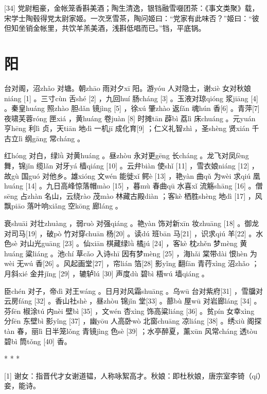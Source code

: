 \documentclass[12pt,UTF8]{ctexbook}
\begin{document}
[34] 党尉粗豪，金帐笼香斟美酒；陶生清逸，银铛融雪啜团茶：《事文类聚》载，宋学士陶毂得党太尉家姬。一次烹雪茶，陶问姬曰：“党家有此味否？”姬曰：“彼但知坐销金帐里，共饮羊羔美酒，浅斟低唱而已。”铛，平底锅。





\chapter{阳}


台对阁，沼zhǎo 对塘。朝zhāo 雨对夕xī 阳。游yóu 人对隐士，谢xiè 女对秋娘niáng [1] 。三寸cùn 舌shé [2] ，九回huí 肠cháng [3] 。玉液对琼qióng 浆jiāng [4] 。秦皇huáng 照zhào 胆dǎn 镜jìng [5] ，徐xú 肇zhào 返fǎn 魂hún 香[6] 。青萍[7] 夜啸芙蓉róng 匣xiá ，黄huáng 卷juàn [8] 时摊tān 薜bì 荔lì 床chuáng 。元yuán 亨hēng 利lì 贞，天tiān 地dì 一机jī 成化育[9] ；仁义礼智zhì ，圣shèng 贤xián 千古立lì 纲gāng 常cháng 。

红hóng 对白，绿lǜ 对黄huáng 。昼zhòu 永对更gēng 长cháng 。龙飞对凤fèng 舞，锦jǐn 缆lǎn 对牙yá 樯qiáng [10] 。云弁biàn 使shǐ [11] ，雪衣娘niáng [12] ，故gù 国guó 对他乡。雄xióng 文wén 能徙xǐ 鳄è [13] ，艳yàn 曲qǔ 为wèi 求qiú 凰huáng [14] 。九日高峰惊落帽mào [15] ，暮mù 春曲qū 水喜xǐ 流觞shāng [16] 。僧sēng 占zhàn 名山，云绕rào 茂mào 林藏古殿diàn ；客kè 栖胜shèng 地dì [17] ，风飘piāo 落叶响xiǎng 空kōng 廊láng 。

衰shuāi 对壮zhuàng ，弱ruò 对强qiáng 。艳yàn 饰对新xīn 妆zhuāng [18] 。御龙对司马[19] ，破pò 竹对穿chuān 杨[20] 。读dú 班bān 马[21] ，识求qiú 羊[22] 。水色sè 对山光guāng [23] 。仙xiān 棋藏绿lǜ 橘jú [24] ，客kè 枕zhěn 梦mèng 黄huáng 粱liáng 。池chí 草cǎo 入诗shī 因有梦mèng [25] ，海hǎi 棠带dài 恨hèn 为wèi 无wú 香[26] 。风起画堂[27] ，帘lián 箔[28] 影yǐng 翻fān 青荇xìng 沼zhǎo ；月斜xié 金井jǐng [29] ，辘轳lú [30] 声度dù 碧bì 梧wú 墙qiáng 。

臣chén 对子，帝dì 对王wáng 。日月对风霜shuāng 。乌wū 台对紫府[31] ，雪牖对云房fáng [32] 。香山社shè ，昼zhòu 锦jǐn 堂[33] 。蔀bù 屋wū 对岩廊láng [34] 。芬fēn 椒涂tú 内nèi 壁bì [35] ，文wén 杏xìng 饰高粱liáng [36] 。贫pín 女幸xìng 分fēn 东壁bì 影yǐng [37] ，幽yōu 人高卧wò 北窗chuāng 凉liáng [38] 。绣xiù 阁探tàn 春，丽lì 日半笼lǒng 青镜jìng 色sè [39] ；水亭醉夏，薰xūn 风常cháng 透tòu 碧bì 筒tǒng [40] 香。



* * *



[1] 谢女：指晋代才女谢道韫，人称咏絮高才。秋娘：即杜秋娘，唐宗室李锜（qí）妾，能诗。
\end{document}
